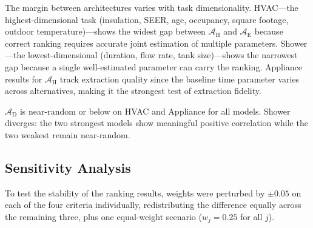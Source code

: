 \documentclass[a4paper,fleqn]{cas-dc}
\begin{document}
The margin between architectures varies with task dimensionality. HVAC---the highest-dimensional task (insulation, SEER, age, occupancy, square footage, outdoor temperature)---shows the widest gap between $\mathcal{A}_{\text{H}}$ and $\mathcal{A}_{\text{E}}$ because correct ranking requires accurate joint estimation of multiple parameters. Shower---the lowest-dimensional (duration, flow rate, tank size)---shows the narrowest gap because a single well-estimated parameter can carry the ranking. Appliance results for $\mathcal{A}_{\text{H}}$ track extraction quality since the baseline time parameter varies across alternatives, making it the strongest test of extraction fidelity.

$\mathcal{A}_{\text{D}}$ is near-random or below on HVAC and Appliance for all models. Shower diverges: the two strongest models show meaningful positive correlation while the two weakest remain near-random.

\FloatBarrier
\subsection{Sensitivity Analysis}
\label{sec:res-sensitivity}

To test the stability of the ranking results, weights were perturbed by $\pm 0.05$ on each of the four criteria individually, redistributing the difference equally across the remaining three, plus one equal-weight scenario ($w_j = 0.25$ for all $j$).
\end{document}
